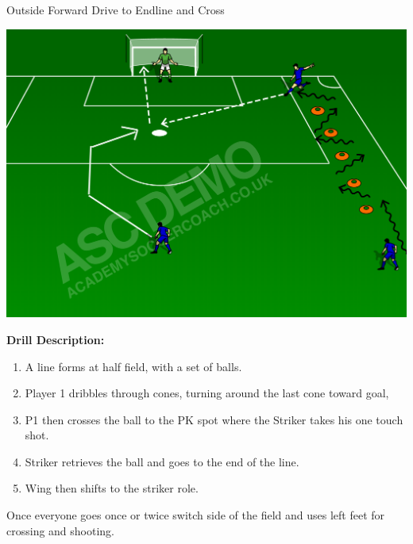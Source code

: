 \begin{evenBlock}{Outside Forward Drive to Endline and Cross}

\begin{minipage}[t]{\linewidth}
    \centering
    
    \begin{minipage}{.3\linewidth} %
        \includegraphics[width=\textwidth]{../img/Trimmed/Dribble-Cross-Shoot}
    \end{minipage}
    \hspace{0.05\linewidth}
    \begin{minipage}{.6\linewidth} %
        \textbf{Drill Description:}
        \begin{enumerate}
        \setlength{\itemsep}{0pt}
        \setlength{\parskip}{0pt}
        \setlength{\parsep}{0pt}
        \item A line forms at half field, with a set of balls.
        \item Player 1 dribbles through cones, turning around the last cone toward goal,
        \item P1 then crosses the ball to the PK spot where the Striker takes his one touch shot.
        \item Striker retrieves the ball and goes to the end of the line.
        \item Wing then shifts to the striker role.
        \end{enumerate}

        \vspace{6pt}
        
        Once everyone goes once or twice switch side of the field and uses left feet for crossing and shooting.


\end{minipage}
\end{minipage}
\end{evenBlock}
